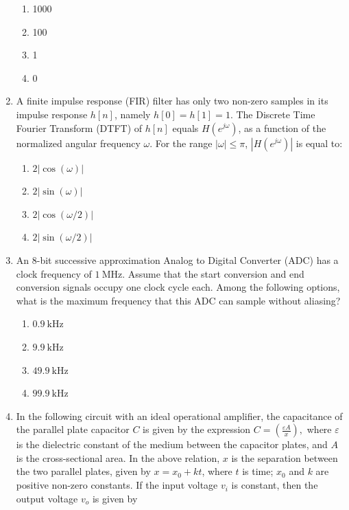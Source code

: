 \documentclass[journal]{IEEEtran}
\begin{document}
\begin{enumerate}
\begin{enumerate}
    \item 1000
    \item 100
    \item 1
    \item 0
\end{enumerate}
\hfill{}

\item 
A finite impulse response (FIR) filter has only two non-zero samples in its impulse response \( h[n] \), namely \( h[0] = h[1] = 1 \). The Discrete Time Fourier Transform (DTFT) of \( h[n] \) equals \( H(e^{j\omega}) \), as a function of the normalized angular frequency \( \omega \). For the range \( |\omega| \leq \pi \), \( |H(e^{j\omega})| \) is equal to:

\begin{enumerate}
    \item \( 2|\cos(\omega)| \)
    \item \( 2|\sin(\omega)| \)
    \item \( 2|\cos(\omega/2)| \)
    \item \( 2|\sin(\omega/2)| \)
\end{enumerate}
\hfill{}

\item 
An 8-bit successive approximation Analog to Digital Converter (ADC) has a clock frequency of \( 1~\text{MHz} \). Assume that the start conversion and end conversion signals occupy one clock cycle each. Among the following options, what is the maximum frequency that this ADC can sample without aliasing?

\begin{enumerate}
    \item \( 0.9~\text{kHz} \)
    \item \( 9.9~\text{kHz} \)
    \item \( 49.9~\text{kHz} \)
    \item \( 99.9~\text{kHz} \)
\end{enumerate}
\hfill{}

\item 
In the following circuit with an ideal operational amplifier, the capacitance of the parallel plate capacitor \( C \) is given by the expression 
$
C = \left(\frac{\varepsilon A}{x}\right),
$
where \( \varepsilon \) is the dielectric constant of the medium between the capacitor plates, and \( A \) is the cross-sectional area. In the above relation, \( x \) is the separation between the two parallel plates, given by \( x = x_0 + kt \), where \( t \) is time; \( x_0 \) and \( k \) are positive non-zero constants. If the input voltage \( v_i \) is constant, then the output voltage \( v_o \) is given by


\end{enumerate}
\end{document}
